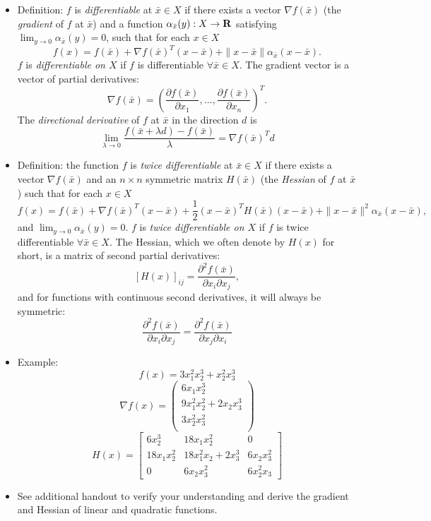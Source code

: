 \documentclass[11pt]{article}
\newcommand{\oh}{\frac12}
\newcommand{\gfb}{\nabla f(\bar x)}
\newcommand{\hfb}{H(\bar x)}
\begin{document}
\begin{itemize}
\item Definition: $f$ is \emph{differentiable} at $\bar x\in X$ if there exists a vector $\gfb$ (the \emph{gradient} of $f$ at $\bar x$) and a function $\alpha_{\bar x}(y):X\rightarrow{\mbox{\textbf{R}}}$ satisfying $\lim_{y\rightarrow0}\alpha_{\bar x}(y)=0$, such that for each $x\in X$
$$
f(x)=f(\bar x)+\gfb^T(x-\bar x)+\|x-\bar x\|\alpha_{\bar x}(x-\bar x).
$$
$f$ is \emph{differentiable on $X$} if $f$ is differentiable $\forall\bar x\in X$. The gradient
vector is a vector of partial derivatives:
$$
\gfb=\left(\frac{\partial f(\bar x)}{\partial x_1},\ldots,
\frac{\partial f(\bar x)}{\partial x_n}\right)^T.
$$
The \emph{directional derivative} of $f$ at $\bar x$ in the direction
$d$ is
$$
\lim_{\lambda\rightarrow0}\frac{f(\bar x+\lambda d)-f(\bar
x)}{\lambda} =\gfb^Td
$$
\item
Definition: the function $f$ is \emph{twice differentiable} at $\bar x\in X$ if
there exists a vector $\gfb$ and an $n\times n$ symmetric matrix $H(\bar x)$
(the \emph{Hessian} of $f$ at $\bar x$) such that for each $x\in X$
$$
f(x)=f(\bar x)+\gfb^T(x-\bar x)+\oh(x-\bar x)^T\hfb(x-\bar x)+
\|x-\bar x\|^2\alpha_{\bar x}(x-\bar x),
$$
and $\lim_{y\rightarrow 0}\alpha_{\bar x}(y)=0$. $f$ is \emph{twice
differentiable on $X$} if $f$ is twice differentiable $\forall\bar
x\in X$. The Hessian, which we often denote by $H(x)$ for short, is a matrix of second partial derivatives:
$$
[H(x)]_{ij}=\frac{\partial^2 f(\bar x)}{\partial x_i\partial x_j},
$$
and for functions with continuous second derivatives, it will always be symmetric:
$$
\frac{\partial^2 f(\bar x)}{\partial x_i\partial x_j}=\frac{\partial^2 f(\bar x)}{\partial x_j\partial x_i}
$$
\item Example:$$f(x)=3x_1^2x_2^3+x_2^2x_3^3$$
$$
\nabla f(x)=\left(
\begin{array}{c}
6x_1x_2^3\\
9x_1^2x_2^2+2x_2x_3^3\\
3x_2^2x_3^2\\
\end{array}
\right)
$$
$$
H(x)=\left[
\begin{array}{ccc}
6x_2^3&18x_1x_2^2&0\\
18x_1x_2^2&18x_1^2x_2+2x_3^3&6x_2x_3^2\\
0&6x_2x_3^2&6x_2^2x_3
\end{array}
\right]
$$
\item See additional handout to verify your understanding and derive the gradient and Hessian of linear and quadratic functions.
\end{itemize}
\end{document}
